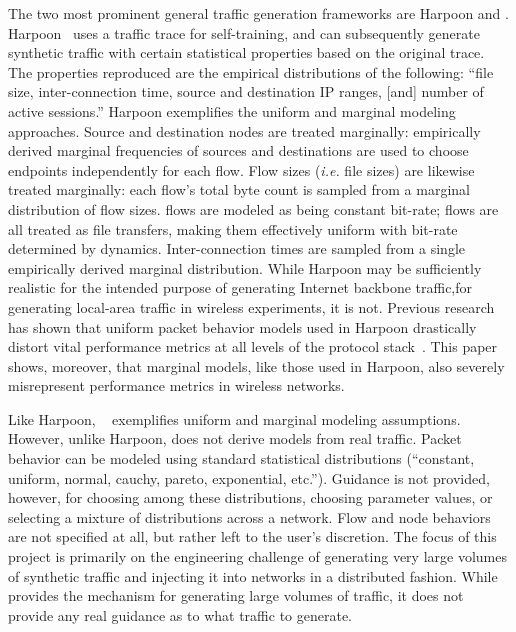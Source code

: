 \documentclass[twocolumn,final]{svjour3}
\newcommand{\caps}[1]{{\smaller{#1}}}
\newcommand{\latin}[1]{\textit{#1}}
\begin{document}
The two most prominent general traffic generation frameworks are Harpoon and \caps{D-ITG}. Harpoon~\cite{Sommers04} uses a traffic trace for self-training, and can subsequently generate synthetic traffic with certain statistical properties based on the original trace.
The properties reproduced are the empirical distributions of the following: ``file size, inter-connection time, source and destination IP ranges, [and] number of active sessions.''
Harpoon exemplifies the uniform and marginal modeling approaches.
Source and destination nodes are treated marginally: empirically derived marginal frequencies of sources and destinations are used to choose endpoints independently for each flow.
Flow sizes (\latin{i.e.} file sizes) are likewise treated marginally: each flow's total byte  count is sampled from a marginal distribution of flow sizes.
\caps{UDP} flows are modeled as being constant bit-rate; %
\caps{TCP} flows are all treated as file transfers, making them effectively uniform with bit-rate determined by \caps{TCP} dynamics.
Inter-connection times %
are sampled from a single empirically derived marginal distribution.
While Harpoon may be sufficiently realistic for the intended purpose of generating Internet backbone traffic,\harpoonnote for generating local-area traffic in wireless experiments, it is not.
Previous research has shown that uniform packet behavior models used in Harpoon drastically distort vital performance metrics at all levels of the protocol stack~\cite{Karpinski07:cbr-failure}. %
This paper shows, moreover, that marginal models, like those used in Harpoon, also severely misrepresent performance metrics in wireless networks.

Like Harpoon, \caps{D-ITG}~\cite{Avallone04} exemplifies uniform and marginal modeling assumptions. However, unlike Harpoon, \caps{D-ITG} does not derive models from real traffic.
Packet behavior can be modeled using standard statistical distributions (``constant, uniform, normal, cauchy, pareto, exponential, etc.'').
Guidance is not provided, however, for choosing among these distributions, choosing parameter values, or selecting a mixture of distributions across a network.
Flow and node behaviors are not specified at all, but rather left to the user's discretion.
The focus of this project is primarily on the engineering challenge of generating very large volumes of synthetic traffic and injecting it into networks in a distributed fashion.
While \caps{D-ITG} provides the mechanism for generating large volumes of traffic, it does not provide any real guidance as to what traffic to generate.
\end{document}
